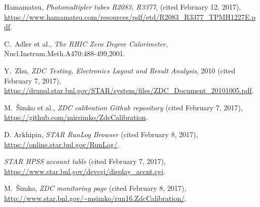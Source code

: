 \begin{thebibliography}{9}
 Hamamatsu, \textit{Photomultipler tubes R2083, R3377}, 
(cited February 12, 2017),
\url{https://www.hamamatsu.com/resources/pdf/etd/R2083_R3377_TPMH1227E.pdf}.

 C.\ Adler et al., \textit{The RHIC Zero Degree Calorimeter},
Nucl.Instrum.Meth.A470:488-499,2001.

 Y.\ Zhu, \textit{ZDC Testing, Electronics Layout and Result Analysis}, 2010
(cited February 7, 2017),
\url{https://drupal.star.bnl.gov/STAR/system/files/ZDC_Document_20101005.pdf}.

 M.\ Šimko et al., \textit{ZDC calibration Github repository}
(cited February 7, 2017), \url{https://github.com/mirsimko/ZdcCalibration}.

 D. Arkhipin, \textit{STAR RunLog Browser} (cited February 8, 2017),
\url{https://online.star.bnl.gov/RunLog/}.

 \textit{STAR HPSS account table} (cited February 7, 2017),
\url{https://www.star.bnl.gov/devcgi/display_accnt.cgi}.

 M.\ Šimko, \textit{ZDC monitoring page} (cited February 8, 2017),
\url{http://www.star.bnl.gov/~msimko/run16.ZdcCalibration/}.
\end{thebibliography}
